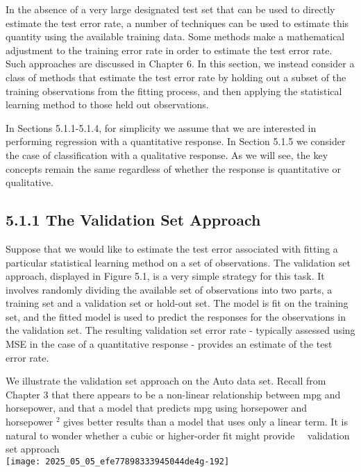 \documentclass[10pt]{article}
\begin{document}
In the absence of a very large designated test set that can be used to directly estimate the test error rate, a number of techniques can be used to estimate this quantity using the available training data. Some methods make a mathematical adjustment to the training error rate in order to estimate the test error rate. Such approaches are discussed in Chapter 6. In this section, we instead consider a class of methods that estimate the test error rate by holding out a subset of the training observations from the fitting process, and then applying the statistical learning method to those held out observations.

In Sections 5.1.1-5.1.4, for simplicity we assume that we are interested in performing regression with a quantitative response. In Section 5.1.5 we consider the case of classification with a qualitative response. As we will see, the key concepts remain the same regardless of whether the response is quantitative or qualitative.

\subsection*{5.1.1 The Validation Set Approach}
Suppose that we would like to estimate the test error associated with fitting a particular statistical learning method on a set of observations. The validation set approach, displayed in Figure 5.1, is a very simple strategy for this task. It involves randomly dividing the available set of observations into two parts, a training set and a validation set or hold-out set. The model is fit on the training set, and the fitted model is used to predict the responses for the observations in the validation set. The resulting validation set error rate - typically assessed using MSE in the case of a quantitative response - provides an estimate of the test error rate.

We illustrate the validation set approach on the Auto data set. Recall from Chapter 3 that there appears to be a non-linear relationship between mpg and horsepower, and that a model that predicts mpg using horsepower and horsepower ${ }^{2}$ gives better results than a model that uses only a linear term. It is natural to wonder whether a cubic or higher-order fit might provide\
\
validation set approach\\
\texttt{[image: 2025\_05\_05\_efe77898333945044de4g-192]}
\end{document}
